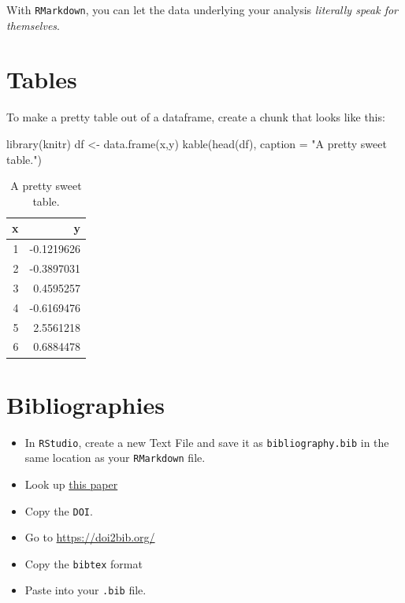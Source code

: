 \documentclass[
]{book}
\newenvironment{Shaded}{\begin{snugshade}}{\end{snugshade}}
\newcommand{\AttributeTok}[1]{\textcolor[rgb]{0.77,0.63,0.00}{#1}}
\newcommand{\FunctionTok}[1]{\textcolor[rgb]{0.00,0.00,0.00}{#1}}
\newcommand{\NormalTok}[1]{#1}
\newcommand{\OtherTok}[1]{\textcolor[rgb]{0.56,0.35,0.01}{#1}}
\newcommand{\StringTok}[1]{\textcolor[rgb]{0.31,0.60,0.02}{#1}}
\begin{document}
With \texttt{RMarkdown}, you can let the data underlying your analysis \emph{literally speak for themselves}.

\hypertarget{tables}{%
\section*{Tables}\label{tables}}

To make a pretty table out of a dataframe, create a chunk that looks like this:

\begin{Shaded}
\begin{Highlighting}[]
\FunctionTok{library}\NormalTok{(knitr)}
\NormalTok{df }\OtherTok{\textless{}{-}} \FunctionTok{data.frame}\NormalTok{(x,y)}
\FunctionTok{kable}\NormalTok{(}\FunctionTok{head}\NormalTok{(df), }\AttributeTok{caption =} \StringTok{"A pretty sweet table."}\NormalTok{)}
\end{Highlighting}
\end{Shaded}

\begin{table}

\caption{\label{tab:unnamed-chunk-215}A pretty sweet table.}
\centering
\begin{tabular}[t]{r|r}
\hline
x & y\\
\hline
1 & -0.1219626\\
\hline
2 & -0.3897031\\
\hline
3 & 0.4595257\\
\hline
4 & -0.6169476\\
\hline
5 & 2.5561218\\
\hline
6 & 0.6884478\\
\hline
\end{tabular}
\end{table}

\hypertarget{bibliographies}{%
\section*{Bibliographies}\label{bibliographies}}

\begin{itemize}
\item
  In \texttt{RStudio}, create a new Text File and save it as \texttt{bibliography.bib} in the same location as your \texttt{RMarkdown} file.
\item
  Look up \href{https://www.researchgate.net/publication/260642613_Statistical_exponential_formulas_for_homogeneous_diffusion}{this paper}
\item
  Copy the \texttt{DOI}.
\item
  Go to \url{https://doi2bib.org/}
\item
  Copy the \texttt{bibtex} format
\item
  Paste into your \texttt{.bib} file.
\end{itemize}
\end{document}
